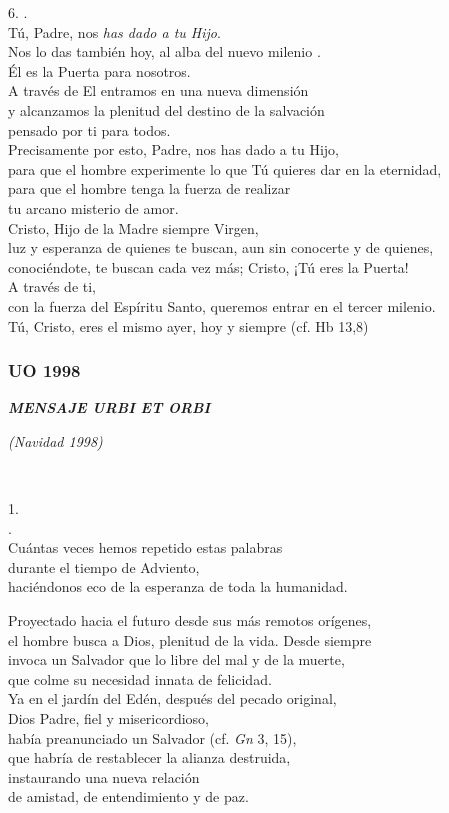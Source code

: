 6. .\\ Tú, Padre, nos \emph{has dado a tu Hijo}.\\ Nos lo das también hoy, al alba del nuevo milenio .\\ Él es la Puerta para nosotros.\\ A través de El entramos en una nueva dimensión\\ y alcanzamos la plenitud del destino de la salvación\\ pensado por ti para todos.\\ Precisamente por esto, Padre, nos has dado a tu Hijo,\\ para que el hombre experimente lo que Tú quieres dar en la eternidad,\\ para que el hombre tenga la fuerza de realizar\\ tu arcano misterio de amor.\\ Cristo, Hijo de la Madre siempre Virgen,\\ luz y esperanza de quienes te buscan, aun sin conocerte y de quienes, conociéndote, te buscan cada vez más; Cristo, ¡Tú eres la Puerta!\\ A través de ti,\\ con la fuerza del Espíritu Santo, queremos entrar en el tercer milenio.\\ Tú, Cristo, eres el mismo ayer, hoy y siempre (cf. Hb 13,8)

\subsubsection{UO 1998} \textbf{\emph{MENSAJE URBI ET ORBI}}

\emph{(Navidad 1998)}

~

1. \emph{}\\ .\\ Cuántas veces hemos repetido estas palabras\\ durante el tiempo de Adviento,\\ haciéndonos eco de la esperanza de toda la humanidad.

Proyectado hacia el futuro desde sus más remotos orígenes,\\ el hombre busca a Dios, plenitud de la vida. Desde siempre\\ invoca un Salvador que lo libre del mal y de la muerte,\\ que colme su necesidad innata de felicidad.\\ Ya en el jardín del Edén, después del pecado original,\\ Dios Padre, fiel y misericordioso,\\ había preanunciado un Salvador (cf. \emph{Gn} 3, 15),\\ que habría de restablecer la alianza destruida,\\ instaurando una nueva relación\\ de amistad, de entendimiento y de paz.

